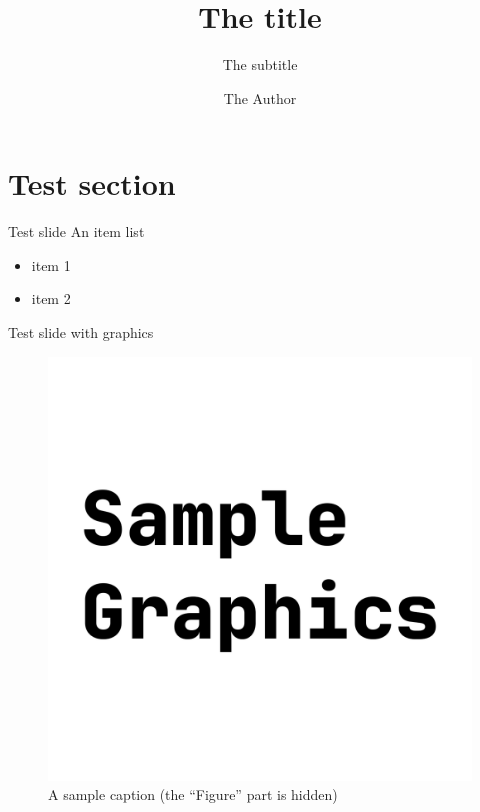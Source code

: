 \documentclass[aspectratio=169]{beamer}
\title{The title}
\subtitle{The subtitle}
\author{The Author}
\institute{University of Gothenburg}
\begin{document}
\begin{frame}
  \maketitle
\end{frame}

\section{Test section}

\begin{frame}{Test slide}
  An item list
  \begin{itemize}
  \item item 1
  \item item 2
  \end{itemize}
\end{frame}

\begin{frame}[fragile]{Test slide with graphics}
  \begin{figure}
    \includegraphics[height=0.6\textheight]{sample-graphics.pdf}
    \caption{A sample caption (the ``Figure'' part is hidden)}
  \end{figure}
\end{frame}

\begin{frame}
  \makefinal
\end{frame}
  
\end{document}

